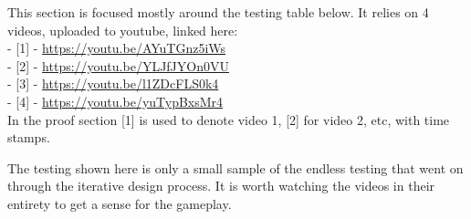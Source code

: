 
This section is focused mostly around the testing table below. It relies on 4 videos, uploaded to youtube, linked here:
\\
- [1] - \url{https://youtu.be/AYuTGnz5iWs}\\
- [2] - \url{https://youtu.be/YLJfJYOn0VU}\\
- [3] - \url{https://youtu.be/l1ZDcFLS0k4}\\
- [4] - \url{https://youtu.be/yuTypBxsMr4}\\

In the proof section [1] is used to denote video 1, [2] for video 2, etc, with time stamps. 

The testing shown here is only a small sample of the endless testing that went on through the iterative design process. It is worth watching the videos in their entirety to get a sense for the gameplay.
